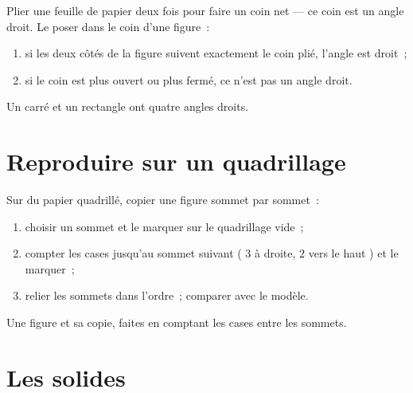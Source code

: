 \begin{method}\label{met:g2:shapes:rightangle}
Plier une feuille de papier deux fois pour faire un coin net --- ce
coin est un angle droit. Le poser dans le coin d'une figure~:
\begin{enumerate}
  \item si les deux côtés de la figure suivent exactement le coin
        plié, l'angle est droit~;
  \item si le coin est plus ouvert ou plus fermé, ce n'est pas un
        angle droit.
\end{enumerate}
Un carré et un rectangle ont quatre angles droits.
\end{method}

\section{Reproduire sur un quadrillage}

\begin{method}\label{met:g2:shapes:copy}
Sur du papier quadrillé, copier une figure sommet par sommet~:
\begin{enumerate}
  \item choisir un sommet et le marquer sur le quadrillage vide~;
  \item compter les cases jusqu'au sommet suivant
        (\guillemotleft{} $3$ à droite, $2$ vers le haut
        \guillemotright{}) et le marquer~;
  \item relier les sommets dans l'ordre~; comparer avec le modèle.
\end{enumerate}
\end{method}

\begin{omfigure}

{\small Une figure et sa copie, faites en comptant les cases entre les
sommets.}
\end{omfigure}

\section{Les solides}


